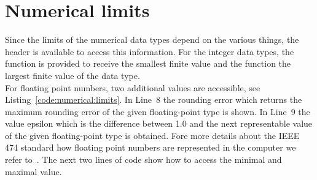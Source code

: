 

\section{Numerical limits}
Since the limits of the numerical data types depend on the various things, the  header is available to access this information. For the integer data types, the function  is provided to receive the smallest finite value and the function  the largest finite value of the  data type.\\

For floating point numbers, two additional values are accessible, see Listing~\ref{code:numerical:limits}. In Line~8 the rounding error  which returns the maximum rounding error of
the given floating-point type is shown. In Line~9 the value epsilon  which is the difference between 1.0 and the next representable value of the given floating-point type is obtained. Fore more details about the IEEE 474 standard how floating point numbers are represented in the computer we refer to~\cite{4610935,goldberg1991every}. The next two lines of code show how to access the minimal and maximal value.






